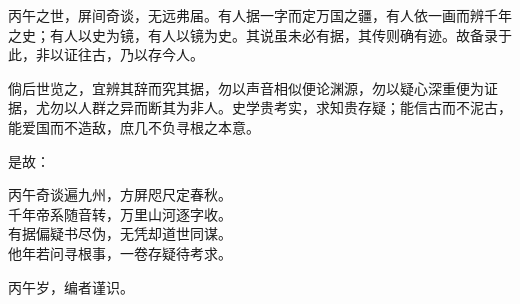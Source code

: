 丙午之世，屏间奇谈，无远弗届。有人据一字而定万国之疆，有人依一画而辨千年之史；有人以史为镜，有人以镜为史。其说虽未必有据，其传则确有迹。故备录于此，非以证往古，乃以存今人。

倘后世览之，宜辨其辞而究其据，勿以声音相似便论渊源，勿以疑心深重便为证据，尤勿以人群之异而断其为非人。史学贵考实，求知贵存疑；能信古而不泥古，能爱国而不造敌，庶几不负寻根之本意。

是故：

\vspace{8mm}
\begin{verseblock}
丙午奇谈遍九州，方屏咫尺定春秋。 \\
千年帝系随音转，万里山河逐字收。 \\
有据偏疑书尽伪，无凭却道世同谋。 \\
他年若问寻根事，一卷存疑待考求。
\end{verseblock}
\begin{flushright}\vspace{9mm}\textcolor{wine}{丙午岁，编者谨识。}\end{flushright}
